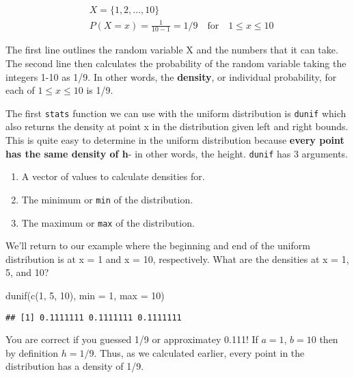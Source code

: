 \documentclass[
]{book}
\newenvironment{Shaded}{\begin{snugshade}}{\end{snugshade}}
\newcommand{\AttributeTok}[1]{\textcolor[rgb]{0.77,0.63,0.00}{#1}}
\newcommand{\DecValTok}[1]{\textcolor[rgb]{0.00,0.00,0.81}{#1}}
\newcommand{\FunctionTok}[1]{\textcolor[rgb]{0.00,0.00,0.00}{#1}}
\newcommand{\NormalTok}[1]{#1}
\begin{document}
\[
\begin{split}
&X=\{1,2,...,10\}\\&P(X=x)=\frac{1}{10-1}=1/9\quad\textrm{for}\quad1\leq x\leq 10 
\end{split}
\]

The first line outlines the random variable X and the numbers that it can take. The second line then calculates the probability of the random variable taking the integers 1-10 as 1/9. In other words, the \textbf{density}, or individual probability, for each of \(1\leq x\leq 10\) is 1/9.

The first \texttt{stats} function we can use with the uniform distribution is \texttt{dunif} which also returns the density at point x in the distribution given left and right bounds. This is quite easy to determine in the uniform distribution because \textbf{every point has the same density of h}- in other words, the height. \texttt{dunif} has 3 arguments.

\begin{enumerate}
\def\labelenumi{\arabic{enumi}.}
\item
  A vector of values to calculate densities for.
\item
  The minimum or \texttt{min} of the distribution.
\item
  The maximum or \texttt{max} of the distribution.
\end{enumerate}

We'll return to our example where the beginning and end of the uniform distribution is at x = 1 and x = 10, respectively. What are the densities at x = 1, 5, and 10?

\begin{Shaded}
\begin{Highlighting}[]
\FunctionTok{dunif}\NormalTok{(}\FunctionTok{c}\NormalTok{(}\DecValTok{1}\NormalTok{, }\DecValTok{5}\NormalTok{, }\DecValTok{10}\NormalTok{), }\AttributeTok{min =} \DecValTok{1}\NormalTok{, }\AttributeTok{max =} \DecValTok{10}\NormalTok{)}
\end{Highlighting}
\end{Shaded}

\begin{verbatim}
## [1] 0.1111111 0.1111111 0.1111111
\end{verbatim}

You are correct if you guessed 1/9 or approximatey 0.111! If \(a = 1\), \(b = 10\) then by definition \(h = 1/9\). Thus, as we calculated earlier, every point in the distribution has a density of 1/9.
\end{document}
